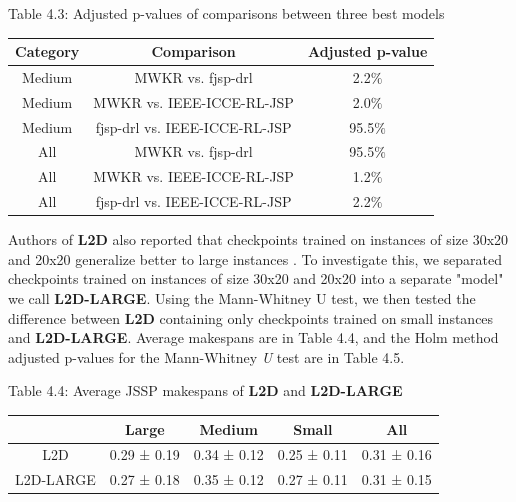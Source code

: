 \begin{table}
    Table 4.3: Adjusted p-values of comparisons between three best models\\
    \vspace{1mm}
    \label{table:4.3}
    \begin{tabular}{ccc}
        \toprule
        Category & Comparison & Adjusted p-value \\
        \midrule
        Medium & MWKR vs. fjsp-drl & 2.2$\%$ \\
        Medium & MWKR vs. IEEE-ICCE-RL-JSP & 2.0$\%$ \\
        Medium & fjsp-drl vs. IEEE-ICCE-RL-JSP & 95.5$\%$ \\\hline
        All & MWKR vs. fjsp-drl & 95.5$\%$ \\
        All & MWKR vs. IEEE-ICCE-RL-JSP & 1.2$\%$ \\
        All & fjsp-drl vs. IEEE-ICCE-RL-JSP & 2.2$\%$ \\
        \bottomrule
    \end{tabular}
\end{table}


Authors of \textbf{L2D} also reported that checkpoints trained on instances of size 30x20 and 20x20 generalize better to large instances \cite{zhang2020learning}. To investigate this, we separated checkpoints trained on instances of size 30x20 and 20x20 into a separate "model" we call \textbf{L2D-LARGE}. Using the Mann-Whitney U test, we then tested the difference between \textbf{L2D} containing only checkpoints trained on small instances and \textbf{L2D-LARGE}. Average makespans are in Table 4.4, and the Holm method adjusted p-values for the Mann-Whitney \textit{U} test are in Table 4.5.

\begin{table}
    Table 4.4: Average JSSP makespans of \textbf{L2D} and \textbf{L2D-LARGE}\\
    \vspace{1mm}
\begin{tabular}{ccccc}
    \toprule
    & Large & Medium & Small & All \\
    \midrule
    L2D & 0.29 ± 0.19 & 0.34 ± 0.12 & 0.25 ± 0.11 & 0.31 ± 0.16 \\
    L2D-LARGE & 0.27 ± 0.18 & 0.35 ± 0.12 & 0.27 ± 0.11 & 0.31 ± 0.15 \\
    \bottomrule
    \end{tabular}
\end{table}

